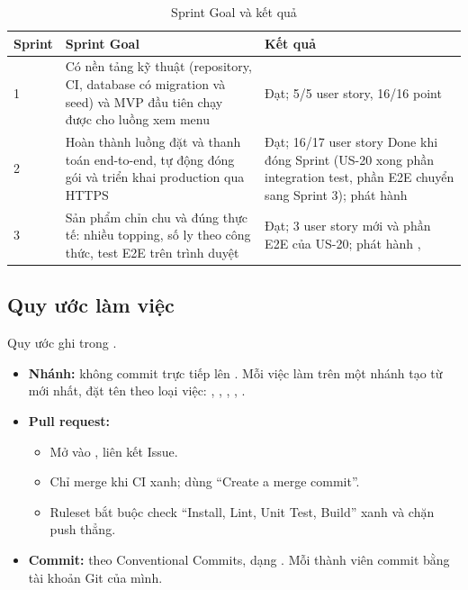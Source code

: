 \begin{table}[H]
\centering
\caption{Sprint Goal và kết quả}\label{tab:sprintgoal}
\begin{tabular}{@{}L{1.6cm}L{6.2cm}L{6cm}@{}}
\toprule
\textbf{Sprint} & \textbf{Sprint Goal} & \textbf{Kết quả} \\  & Có nền tảng kỹ thuật (repository, CI, database có migration và seed) và MVP đầu tiên chạy được cho luồng xem menu & Đạt; 5/5 user story, 16/16 point \\
2 & Hoàn thành luồng đặt và thanh toán end-to-end, tự động đóng gói và triển khai production qua HTTPS & Đạt; 16/17 user story Done khi đóng Sprint (US-20 xong phần integration test, phần E2E chuyển sang Sprint 3); phát hành  \\
3 & Sản phẩm chỉn chu và đúng thực tế: nhiều topping, số ly theo công thức, test E2E trên trình duyệt & Đạt; 3 user story mới và phần E2E của US-20; phát hành ,  \\
\bottomrule
\end{tabular}
\end{table}

\subsection{Quy ước làm việc}\label{sec:quyuoc}
Quy ước ghi trong .

\begin{itemize}
\item \textbf{Nhánh:} không commit trực tiếp lên . Mỗi việc làm trên một nhánh tạo từ  mới nhất, đặt tên theo loại việc: , , , , .
\item \textbf{Pull request:}
  \begin{itemize}
  \item Mở vào , liên kết Issue.
  \item Chỉ merge khi CI xanh; dùng ``Create a merge commit''.
  \item Ruleset  bắt buộc check ``Install, Lint, Unit Test, Build'' xanh và chặn push thẳng.
  \end{itemize}
\item \textbf{Commit:} theo Conventional Commits, dạng . Mỗi thành viên commit bằng tài khoản Git của mình.
\end{itemize}

